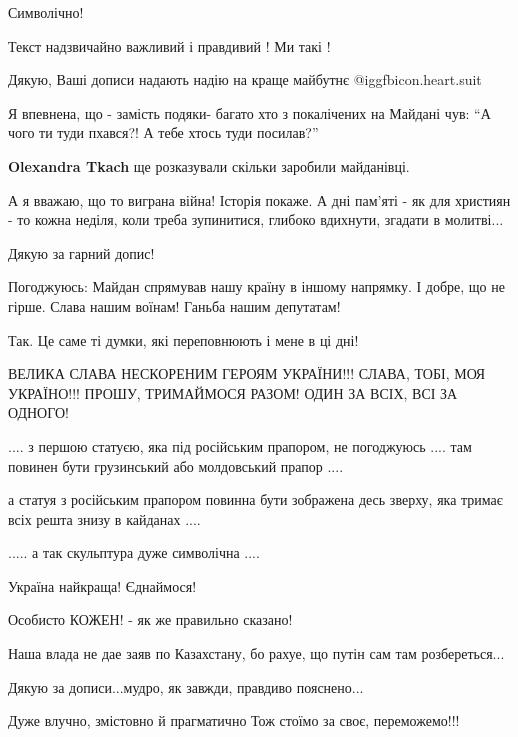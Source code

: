 \begin{itemize}
Символічно!

Текст надзвичайно важливий і правдивий ! Ми такі !

Дякую, Ваші дописи надають надію на краще майбутнє @igg{fbicon.heart.suit}


Я впевнена, що - замість подяки- багато хто з покалічених на Майдані чув: \enquote{А
чого ти туди пхався?! А тебе хтось туди посилав?}

\textbf{Olexandra Tkach} ще розказували скільки заробили майданівці.


А я вважаю, що то виграна війна! Історія покаже. А дні пам'яті - як для
християн - то кожна неділя, коли треба зупинитися, глибоко вдихнути, згадати в
молитві...


Дякую за гарний допис!

Погоджуюсь: Майдан спрямував нашу країну в іншому напрямку. І добре, що не гірше. Слава нашим воїнам! Ганьба нашим депутатам!

Так. Це саме ті думки, які переповнюють і мене в ці дні!

ВЕЛИКА СЛАВА НЕСКОРЕНИМ ГЕРОЯМ УКРАЇНИ!!!
СЛАВА, ТОБІ, МОЯ УКРАЇНО!!!
ПРОШУ, ТРИМАЙМОСЯ РАЗОМ!
ОДИН ЗА ВСІХ, ВСІ ЗА ОДНОГО!


.... з першою статуєю, яка під російським прапором, не погоджуюсь .... там повинен
бути грузинський або молдовський прапор ....

а статуя з російським прапором повинна бути зображена десь зверху, яка тримає
всіх решта знизу в кайданах ....

..... а так скульптура дуже символічна ....

Україна найкраща! Єднаймося!

Особисто КОЖЕН! - як же правильно сказано!


Наша влада не дае заяв по Казахстану, бо рахуе, що путін сам там розбереться...

Дякую за дописи...мудро, як завжди, правдиво пояснено...

Дуже влучно, змістовно й прагматично Тож стоїмо за своє, переможемо!!!


\end{itemize}
